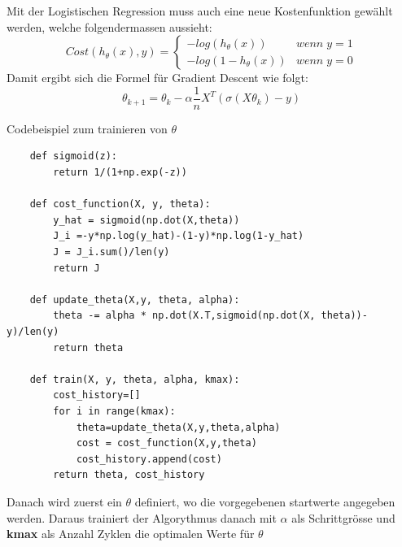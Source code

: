 \documentclass{article}
\begin{document}
	Mit der Logistischen Regression muss auch eine neue Kostenfunktion gewählt werden, welche folgendermassen aussieht:
	$$Cost(h_\theta(x), y) = \begin{cases}
	-log(h_\theta(x)) & wenn\;y = 1 \\
	-log(1-h_\theta(x)) & wenn\;y = 0
	\end{cases}$$
	Damit ergibt sich die Formel für Gradient Descent wie folgt:
	$$\theta_{k+1}=\theta_k-\alpha\frac{1}{n}X^T(\sigma(X\theta_k)-y)$$
	
	Codebeispiel zum trainieren von $\theta$
	\begin{lstlisting}
	def sigmoid(z):
		return 1/(1+np.exp(-z))
	
	def cost_function(X, y, theta):
		y_hat = sigmoid(np.dot(X,theta))
		J_i =-y*np.log(y_hat)-(1-y)*np.log(1-y_hat)
		J = J_i.sum()/len(y)
		return J
	
	def update_theta(X,y, theta, alpha):
		theta -= alpha * np.dot(X.T,sigmoid(np.dot(X, theta))-y)/len(y)
		return theta
	
	def train(X, y, theta, alpha, kmax):
		cost_history=[]
		for i in range(kmax):
			theta=update_theta(X,y,theta,alpha)
			cost = cost_function(X,y,theta)
			cost_history.append(cost)
		return theta, cost_history
	\end{lstlisting}
	Danach wird zuerst ein $\theta$ definiert, wo die vorgegebenen startwerte angegeben werden. Daraus trainiert der Algorythmus danach mit $\alpha$ als Schrittgrösse und \textbf{kmax} als Anzahl Zyklen die optimalen Werte für $\theta$
\end{document}
